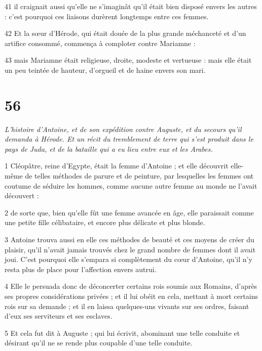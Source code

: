 \par 41 il craignait aussi qu'elle ne s'imaginât qu'il était bien disposé envers les autres : c'est pourquoi ces liaisons durèrent longtemps entre ces femmes.

\par 42 Et la sœur d'Hérode, qui était douée de la plus grande méchanceté et d'un artifice consommé, commença à comploter contre Mariamne :

\par 43 mais Mariamne était religieuse, droite, modeste et vertueuse : mais elle était un peu teintée de hauteur, d'orgueil et de haine envers son mari.

\chapter{56}

\par \textit{L'histoire d'Antoine, et de son expédition contre Auguste, et du secours qu'il demanda à Hérode. Et un récit du tremblement de terre qui s'est produit dans le pays de Juda, et de la bataille qui a eu lieu entre eux et les Arabes.}

\par 1 Cléopâtre, reine d'Egypte, était la femme d'Antoine ; et elle découvrit elle-même de telles méthodes de parure et de peinture, par lesquelles les femmes ont coutume de séduire les hommes, comme aucune autre femme au monde ne l'avait découvert :

\par 2 de sorte que, bien qu'elle fût une femme avancée en âge, elle paraissait comme une petite fille célibataire, et encore plus délicate et plus blonde.

\par 3 Antoine trouva aussi en elle ces méthodes de beauté et ces moyens de créer du plaisir, qu'il n'avait jamais trouvés chez le grand nombre de femmes dont il avait joui. C'est pourquoi elle s'empara si complètement du cœur d'Antoine, qu'il n'y resta plus de place pour l'affection envers autrui.

\par 4 Elle le persuada donc de déconcerter certains rois soumis aux Romains, d'après ses propres considérations privées ; et il lui obéit en cela, mettant à mort certains rois sur sa demande ; et il en laissa quelques-uns vivants sur ses ordres, faisant d'eux ses serviteurs et ses esclaves.

\par 5 Et cela fut dit à Auguste ; qui lui écrivit, abominant une telle conduite et désirant qu'il ne se rende plus coupable d'une telle conduite.

